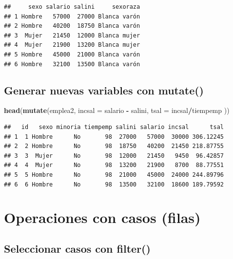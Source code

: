 \documentclass[
]{book}
\newenvironment{Shaded}{\begin{snugshade}}{\end{snugshade}}
\newcommand{\DataTypeTok}[1]{\textcolor[rgb]{0.13,0.29,0.53}{#1}}
\newcommand{\KeywordTok}[1]{\textcolor[rgb]{0.13,0.29,0.53}{\textbf{#1}}}
\newcommand{\NormalTok}[1]{#1}
\newcommand{\OperatorTok}[1]{\textcolor[rgb]{0.81,0.36,0.00}{\textbf{#1}}}
\newcommand{\StringTok}[1]{\textcolor[rgb]{0.31,0.60,0.02}{#1}}
\begin{document}
\begin{verbatim}
##     sexo salario salini     sexoraza
## 1 Hombre   57000  27000 Blanca varón
## 2 Hombre   40200  18750 Blanca varón
## 3  Mujer   21450  12000 Blanca mujer
## 4  Mujer   21900  13200 Blanca mujer
## 5 Hombre   45000  21000 Blanca varón
## 6 Hombre   32100  13500 Blanca varón
\end{verbatim}

\hypertarget{generar-nuevas-variables-con-mutate}{%
\subsection{\texorpdfstring{Generar nuevas variables con \textbf{mutate()}}{Generar nuevas variables con mutate()}}\label{generar-nuevas-variables-con-mutate}}

\begin{Shaded}
\begin{Highlighting}[]
\KeywordTok{head}\NormalTok{(}\KeywordTok{mutate}\NormalTok{(emplea2, }\DataTypeTok{incsal =}\NormalTok{ salario }\OperatorTok{-}\StringTok{ }\NormalTok{salini, }\DataTypeTok{tsal =}\NormalTok{ incsal}\OperatorTok{/}\NormalTok{tiempemp ))}
\end{Highlighting}
\end{Shaded}

\begin{verbatim}
##   id   sexo minoria tiempemp salini salario incsal      tsal
## 1  1 Hombre      No       98  27000   57000  30000 306.12245
## 2  2 Hombre      No       98  18750   40200  21450 218.87755
## 3  3  Mujer      No       98  12000   21450   9450  96.42857
## 4  4  Mujer      No       98  13200   21900   8700  88.77551
## 5  5 Hombre      No       98  21000   45000  24000 244.89796
## 6  6 Hombre      No       98  13500   32100  18600 189.79592
\end{verbatim}

\hypertarget{operaciones-con-casos-filas}{%
\section{Operaciones con casos (filas)}\label{operaciones-con-casos-filas}}

\hypertarget{seleccionar-casos-con-filter}{%
\subsection{\texorpdfstring{Seleccionar casos con \textbf{filter()}}{Seleccionar casos con filter()}}\label{seleccionar-casos-con-filter}}
\end{document}
